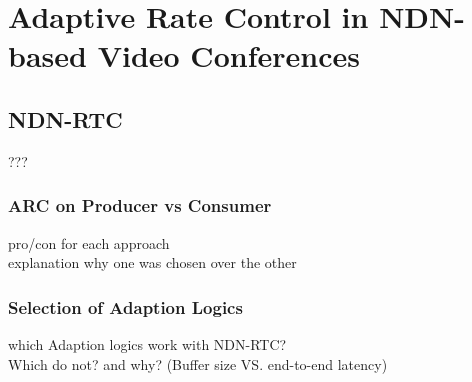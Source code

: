 \chapter{Adaptive Rate Control in NDN-based Video Conferences} \label{chapter:Topic}

\section{NDN-RTC}
???

\subsection{ARC on Producer vs Consumer}
pro/con for each approach \\
explanation why one was chosen over the other

\subsection{Selection of Adaption Logics}
which Adaption logics work with NDN-RTC? \\
Which do not? and why? (Buffer size VS. end-to-end latency)

